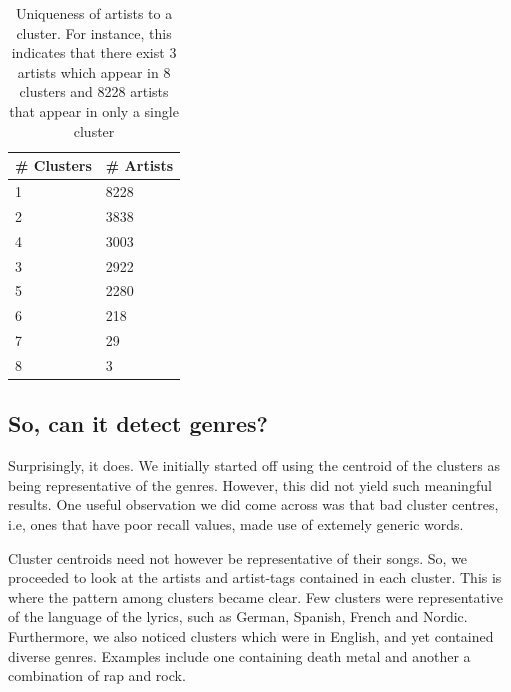 \documentclass[10pt,a4paper]{scrartcl}
\begin{document}
\begin{table}[h]
\centering
\begin{tabular}{@{}ll@{}}
\toprule
\# Clusters & \# Artists \\ \midrule
1             & 8228         \\
2             & 3838         \\
4             & 3003         \\
3             & 2922         \\
5             & 2280         \\
6             & 218          \\
7             & 29           \\
8             & 3            \\ \bottomrule
\end{tabular}
\caption{Uniqueness of artists to a cluster. For instance, this indicates that there exist 3 artists which appear in 8 clusters and 8228 artists that appear in only a single cluster}
\label{tab:num_artists_clusters}
\end{table}
  
  \subsection{So, can it detect genres?}
  Surprisingly, it does.
  We initially started off using the centroid of the clusters as being representative of the genres.
  However, this did not yield such meaningful results.
  One useful observation we did come across was that bad cluster centres, i.e, ones that have poor recall values, made use of extemely generic words.
  
  Cluster centroids need not however be representative of their songs.
  So, we proceeded to look at the artists and artist-tags contained in each cluster.
  This is where the pattern among clusters became clear.
  Few clusters were representative of the language of the lyrics, such as German, Spanish, French and Nordic.
  Furthermore, we also noticed clusters which were in English, and yet contained diverse genres.
  Examples include one containing death metal and another a combination of rap and rock.
  
\end{document}
